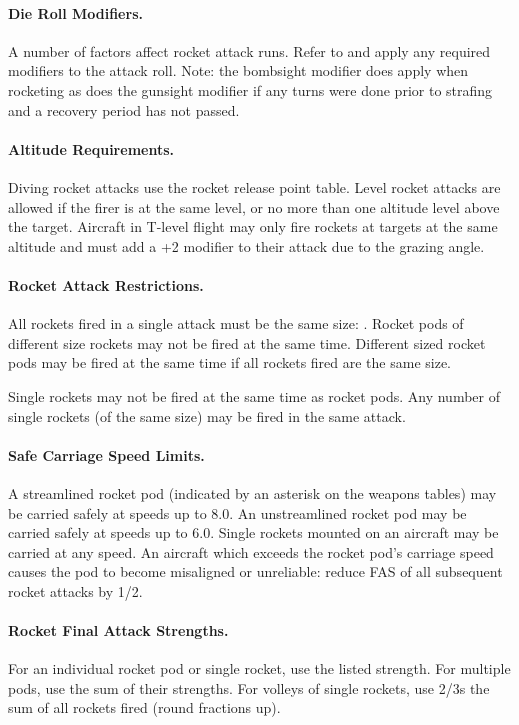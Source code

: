 \paragraph{Die Roll Modifiers.} A number of factors affect rocket attack runs. Refer to  and apply any required modifiers to the attack roll. Note: the bombsight modifier does apply when rocketing as does the gunsight modifier if any turns were done prior to strafing and a recovery period has not passed.

\paragraph{Altitude Requirements.} Diving rocket attacks use the rocket release point table. Level rocket attacks are allowed if the firer is at the same level, or no more than one altitude level above the target. Aircraft in T-level flight may only fire rockets at targets at the same altitude and must add a +2 modifier to their attack due to the grazing angle.

\paragraph{Rocket Attack Restrictions.} All rockets fired in a single attack must be the same size: . Rocket pods of different size rockets may not be fired at the same time. Different sized rocket pods may be fired at the same time if all rockets fired are the same size.

Single rockets may not be fired at the same time as rocket pods. Any number of single rockets (of the same size) may be fired in the same attack.

\paragraph{Safe Carriage Speed Limits.} A streamlined rocket pod (indicated by an asterisk on the weapons tables) may be carried safely at speeds up to 8.0. An unstreamlined rocket pod may be carried safely at speeds up to 6.0. Single rockets mounted on an aircraft may be carried at any speed. An aircraft which exceeds the rocket pod's carriage speed causes the pod to become misaligned or unreliable: reduce FAS of all subsequent rocket attacks by 1/2.

\paragraph{Rocket Final Attack Strengths.} For an individual rocket pod or single rocket, use the listed strength. For multiple pods, use the sum of their strengths. For volleys of single rockets, use 2/3s the sum of all rockets fired (round fractions up).
